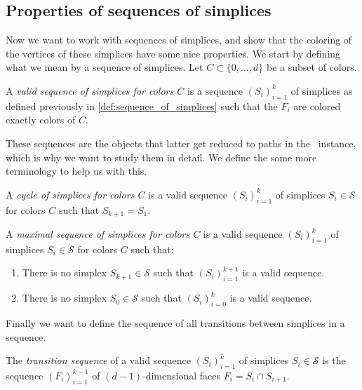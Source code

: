 \subsection{Properties of sequences of simplices}

Now we want to work with sequences of simplices, and show that the coloring of the vertices of these simplices have some nice properties. We start by defining what we mean by a sequence of simplices. Let $C \subset \{0, \dots, d\}$ be a subset of colors.
\begin{definition}
    \label{def:valid_sequence_simplices}
    A \emph{valid sequence of simplices for colors $C$} is a sequence $\left(S_i\right)_{i=1}^{k}$ of simplices as defined previously in \cref{def:sequence_of_simplices} such that the $F_i$ are colored exactly colors of $C$.
\end{definition}
These sequences are the objects that latter get reduced to paths in the \EndOfLine\ instance, which is why we want to study them in detail. We define the some more terminology to help us with this.
\begin{definition}[Cycle]
    A \emph{cycle of simplices for colors $C$} is a valid sequence $\left(S_i\right)_{i=1}^{k}$ of simplices $S_i \in \mathcal{S}$ for colors $C$ such that $S_{k+1} = S_1$.
\end{definition}
\begin{definition}
    A \emph{maximal sequence of simplices for colors $C$} is a valid sequence $\left(S_i\right)_{i=1}^{k}$ of simplices $S_i \in \mathcal{S}$ for colors $C$ such that:
    \begin{enumerate}
        \item There is no simplex $S_{k+1} \in \mathcal{S}$ such that $\left(S_i\right)_{i=1}^{k+1}$ is a valid sequence.
        \item There is no simplex $S_{0} \in \mathcal{S}$ such that $\left(S_i\right)_{i=0}^{k}$ is a valid sequence.
    \end{enumerate}
\end{definition}
Finally we want to define the sequence of all transitions between simplices in a sequence.
\begin{definition}
    The \emph{transition sequence} of a valid sequence $\left(S_i\right)_{i=1}^{k}$ of simplices $S_i \in \mathcal{S}$ is the sequence $\left(F_i\right)_{i=1}^{k-1}$ of $(d-1)$-dimensional faces $F_i = S_i \cap S_{i+1}$.
\end{definition}

